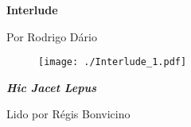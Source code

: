 \pagebreak

\begin{absolutelynopagebreak}
\textbf{Interlude}

Por Rodrigo Dário

\thispagestyle{empty}

\begin{vplace}
\begin{figure}[H]
\begin{adjustwidth}{-3.2cm}{}
  \vspace*{9cm}
  \texttt{[image: ./Interlude\_1.pdf]}  
\end{adjustwidth}

\end{figure}
\end{vplace}

\end{absolutelynopagebreak}

\pagebreak

\textbf{\emph{Hic Jacet Lepus}}

Lido por Régis Bonvicino

